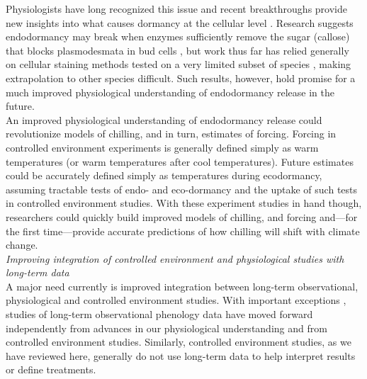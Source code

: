 \documentclass[11pt,letter]{article}
\begin{document}
Physiologists have long recognized this issue and recent breakthroughs provide new insights into what causes dormancy at the cellular level \citep{vanderschoot2014}. Research suggests endodormancy may break when enzymes sufficiently remove the sugar (callose) that blocks plasmodesmata in bud cells \citep[reviewed in][]{chang2021}, but work thus far has relied generally on cellular staining methods tested on a very limited subset of species \citep{rinne2011,singh2019}, making extrapolation to other species difficult. Such results, however, hold promise for a much improved physiological understanding of endodormancy release in the future.\\

An improved physiological understanding of endodormancy release could revolutionize models of chilling, and in turn, estimates of forcing. Forcing in controlled environment experiments is generally defined simply as warm temperatures (or warm temperatures after cool temperatures). Future estimates could be accurately defined simply as temperatures during ecodormancy, assuming tractable tests of endo- and eco-dormancy and the uptake of such tests in controlled environment studies. With these experiment studies in hand though, researchers could quickly build improved models of chilling, and forcing and---for the first time---provide accurate predictions of how chilling will shift with climate change.\\ 

\emph{Improving integration of controlled environment and physiological studies with long-term data}\\
A major need currently is improved integration between long-term observational, physiological and controlled environment studies. With important exceptions \citep[e.g.,][]{gauzere2017}, studies of long-term observational phenology data have moved forward independently from advances in our physiological understanding and from controlled environment studies. Similarly, controlled environment studies, as we have reviewed here, generally do not use long-term data to help interpret results or define treatments. \\
\end{document}
